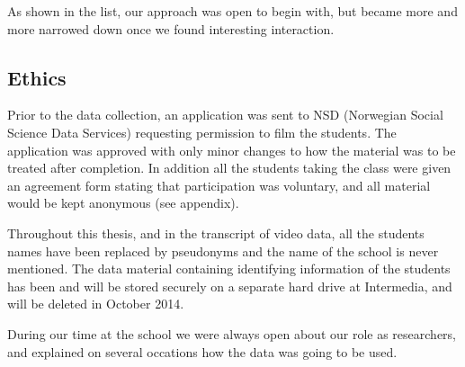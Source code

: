 As shown in the list, our approach was open to begin with, but became more and more narrowed down once we found interesting interaction. 


\subsection{Ethics}
Prior to the data collection, an application was sent to NSD (Norwegian Social Science Data Services) requesting permission to film the students. The application was approved with only minor changes to how the material was to be treated after completion. In addition all the students taking the class were given an agreement form stating that participation was voluntary, and all material would be kept anonymous (see appendix). 

Throughout this thesis, and in the transcript of video data, all the students names have been replaced by pseudonyms and the name of the school is never mentioned. The data material containing identifying information of the students has been and will be stored securely on a separate hard drive at Intermedia, and will be deleted in October 2014. 

During our time at the school we were always open about our role as researchers, and explained on several occations how the data was going to be used. 




